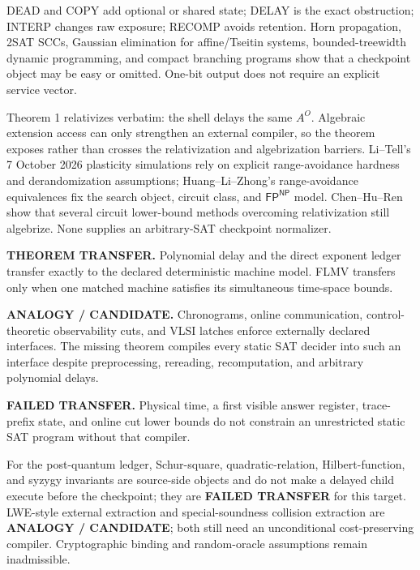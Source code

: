 \documentclass[11pt]{article}
\begin{document}
DEAD and COPY add optional or shared state; DELAY is the exact obstruction;
INTERP changes raw exposure; RECOMP avoids retention.  Horn propagation,
2SAT SCCs, Gaussian elimination for affine/Tseitin systems, bounded-treewidth
dynamic programming, and compact branching programs show that a checkpoint
object may be easy or omitted.  One-bit output does not require an explicit
service vector.

Theorem 1 relativizes verbatim: the shell delays the same $A^O$.  Algebraic
extension access can only strengthen an external compiler, so the theorem
exposes rather than crosses the relativization and algebrization barriers.
Li--Tell's 7 October 2026 plasticity simulations rely on explicit
range-avoidance hardness and derandomization assumptions; Huang--Li--Zhong's
range-avoidance equivalences fix the search object, circuit class, and
$\mathsf{FP}^{\mathsf{NP}}$ model.  Chen--Hu--Ren show that several circuit
lower-bound methods overcoming relativization still algebrize.  None supplies
an arbitrary-SAT checkpoint normalizer.

\begin{description}[leftmargin=0cm,labelwidth=0cm]
\item[] \textbf{THEOREM TRANSFER.}
Polynomial delay and the direct exponent ledger transfer exactly to the
declared deterministic machine model.  FLMV transfers only when one matched
machine satisfies its simultaneous time-space bounds.
\item[] \textbf{ANALOGY / CANDIDATE.}
Chronograms, online communication, control-theoretic observability cuts, and
VLSI latches enforce externally declared interfaces.  The missing theorem
compiles every static SAT decider into such an interface despite preprocessing,
rereading, recomputation, and arbitrary polynomial delays.
\item[] \textbf{FAILED TRANSFER.}
Physical time, a first visible answer register, trace-prefix state, and online
cut lower bounds do not constrain an unrestricted static SAT program without
that compiler.
\end{description}

For the post-quantum ledger, Schur-square, quadratic-relation, Hilbert-function,
and syzygy invariants are source-side objects and do not make a delayed child
execute before the checkpoint; they are \textbf{FAILED TRANSFER} for this
target.  LWE-style external extraction and special-soundness collision
extraction are \textbf{ANALOGY / CANDIDATE}; both still need an unconditional
cost-preserving compiler.  Cryptographic binding and random-oracle assumptions
remain inadmissible.
\end{document}
